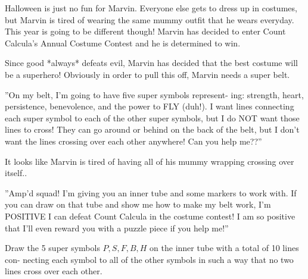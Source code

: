 

Halloween is just no fun for Marvin. Everyone else gets to dress up in costumes,
but Marvin is tired of wearing the same mummy outfit that he wears everyday.
This year is going to be different though! Marvin has decided to enter Count
Calcula’s Annual Costume Contest and he is determined to win.

Since good *always* defeats evil, Marvin has decided that the best costume
will be a superhero! Obviously in order to pull this off, Marvin needs a super
belt.

”On my belt, I’m going to have five super symbols represent-
ing: strength, heart, persistence, benevolence, and the power to FLY
(duh!). I want lines connecting each super symbol to each of the
other super symbols, but I do NOT want those lines to cross! They
can go around or behind on the back of the belt, but I don’t want
the lines crossing over each other anywhere! Can you help me??”

It looks like Marvin is tired of having all of his mummy wrapping crossing
over itself..

”Amp’d squad! I’m giving you an inner tube and some markers
to work with. If you can draw on that tube and show me how to
make my belt work, I’m POSITIVE I can defeat Count Calcula in
the costume contest! I am so positive that I’ll even reward you with
a puzzle piece if you help me!”

Draw the 5 super symbols \(P,S,F,B,H\)
on the inner tube with a total of 10 lines con-
necting each symbol to all of the other symbols in such a way that no two
lines cross over each other.
